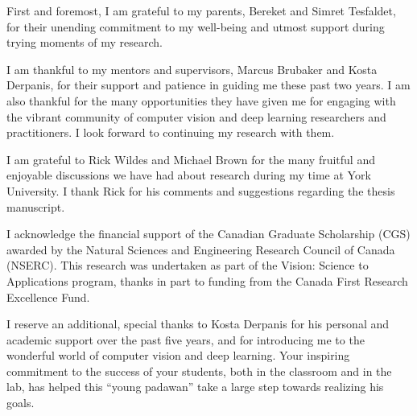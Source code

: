 \begin{acknowledgements}
\thispagestyle{plain}
\setcounter{page}{3}
First and foremost, I am grateful to my parents, Bereket and Simret Tesfaldet, for their unending commitment to my well-being and utmost support during trying moments of my research.

I am thankful to my mentors and supervisors, Marcus Brubaker and Kosta Derpanis, for their support and patience in guiding me these past two years. I am also thankful for the many opportunities they have given me for engaging with the vibrant community of computer vision and deep learning researchers and practitioners. I look forward to continuing my research with them.

I am grateful to Rick Wildes and Michael Brown for the many fruitful and enjoyable discussions we have had about research during my time at York University. I thank Rick for his comments and suggestions regarding the thesis manuscript.

I acknowledge the financial support of the Canadian Graduate Scholarship (CGS) awarded by the Natural Sciences and Engineering Research Council of Canada (NSERC). This research was undertaken as part of the Vision: Science to Applications program, thanks in part to funding from the Canada First Research Excellence Fund.

I reserve an additional, special thanks to Kosta Derpanis for his personal and academic support over the past five years, and for introducing me to the wonderful world of computer vision and deep learning. Your inspiring commitment to the success of your students, both in the classroom and in the lab, has helped this ``young padawan'' take a large step towards realizing his goals.
\end{acknowledgements}